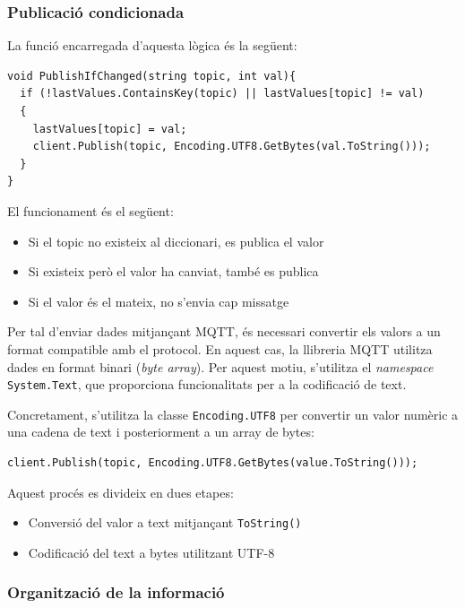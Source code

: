 \documentclass[12pt,a4paper]{report}
\begin{document}
\subsubsection{Publicació condicionada}

La funció encarregada d'aquesta lògica és la següent:

\begin{lstlisting}[language=CSharp, caption=Publicació optimitzada]
void PublishIfChanged(string topic, int val){
  if (!lastValues.ContainsKey(topic) || lastValues[topic] != val)
  {
    lastValues[topic] = val;
    client.Publish(topic, Encoding.UTF8.GetBytes(val.ToString()));
  }
}
\end{lstlisting}

El funcionament és el següent:

\begin{itemize}
    \item Si el topic no existeix al diccionari, es publica el valor
    \item Si existeix però el valor ha canviat, també es publica
    \item Si el valor és el mateix, no s'envia cap missatge
\end{itemize}

Per tal d'enviar dades mitjançant MQTT, és necessari convertir els valors a un format compatible amb el protocol. En aquest cas, la llibreria MQTT utilitza dades en format binari (\textit{byte array}). Per aquest motiu, s'utilitza el \textit{namespace} \texttt{System.Text}, que proporciona funcionalitats per a la codificació de text.

Concretament, s'utilitza la classe \texttt{Encoding.UTF8} per convertir un valor numèric a una cadena de text i posteriorment a un array de bytes:

\begin{lstlisting}[language=CSharp]
client.Publish(topic, Encoding.UTF8.GetBytes(value.ToString()));
\end{lstlisting}

Aquest procés es divideix en dues etapes:
\begin{itemize}
    \item Conversió del valor a text mitjançant \texttt{ToString()}
    \item Codificació del text a bytes utilitzant UTF-8
\end{itemize}

\subsubsection{Organització de la informació}
\end{document}
